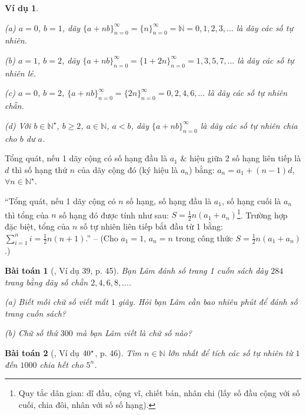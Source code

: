\documentclass{article}
\numberwithin{equation}{section}
\newtheorem{vidu}{Ví dụ}[section]
\newtheorem{baitoan}{Bài toán}[section]
\begin{document}
\begin{vidu}
	\begin{enumerate*}
		\item[(a)] $a = 0$, $b = 1$, dãy $\{a + n b\}_{n=0}^\infty = \{n\}_{n=0}^\infty = \mathbb{N} = 0,1,2,3,\ldots$ là dãy các số tự nhiên.
		\item[(b)] $a = 1$, $b = 2$, dãy $\{a + n b\}_{n=0}^\infty = \{1 + 2n\}_{n=0}^\infty = 1,3,5,7,\ldots$ là dãy các số tự nhiên lẻ.
		\item[(c)] $a = 0$, $b = 2$, $\{a + n b\}_{n=0}^\infty = \{2n\}_{n=0}^\infty = 0,2,4,6,\ldots$ là dãy các số tự nhiên chẵn.
		\item[(d)] Với $b\in\mathbb{N}^\star$, $b\ge 2$, $a\in\mathbb{N}$, $a < b$, dãy $\{a + n b\}_{n=0}^\infty$ là dãy các số tự nhiên chia cho $b$ dư $a$.
	\end{enumerate*}
\end{vidu}
Tổng quát, nếu 1 dãy cộng có số hạng đầu là $a_1$ \& hiệu giữa 2 số hạng liên tiếp là $d$ thì số hạng thứ $n$ của dãy cộng đó (ký hiệu là $a_n$) bằng: $a_n = a_1 + (n - 1)d$, $\forall n\in\mathbb{N}^\star$.

``Tổng quát, nếu 1 dãy cộng có $n$ số hạng, số hạng đầu là $a_1$, số hạng cuối là $a_n$ thì tổng của $n$ số hạng đó được tính như sau: $S = \frac{1}{2}n(a_1 + a_n)$\footnote{Quy tắc dân gian: dĩ đầu, cộng vĩ, chiết bán, nhân chi (lấy số đầu cộng với số cuối, chia đôi, nhân với số số hạng).}. Trường hợp đặc biệt, tổng của $n$ số tự nhiên liên tiếp bắt đầu từ 1 bằng: $\sum_{i=1}^n i = \frac{1}{2}n(n + 1)$.'' -- \cite[p. 45]{Binh_Toan_6_tap_1} (Cho $a_1 = 1$, $a_n = n$ trong công thức $S = \frac{1}{2}n(a_1 + a_n)$.)

\begin{baitoan}[\cite{Binh_Toan_6_tap_1}, Ví dụ 39, p. 45]
	Bạn Lâm đánh số trang 1 cuốn sách dày $284$ trang bằng dãy số chẵn $2,4,6,8,\ldots$.
	\begin{enumerate*}
		\item[(a)] Biết mỗi chữ số viết mất $1$ giây. Hỏi bạn Lâm cần bao nhiêu phút để đánh số trang cuốn sách?
		\item[(b)] Chữ số thứ $300$ mà bạn Lâm viết là chữ số nào?
	\end{enumerate*}
\end{baitoan}

\begin{baitoan}[\cite{Binh_Toan_6_tap_1}, Ví dụ $\rm 40^\star$, p. 46]
	Tìm $n\in\mathbb{N}$ lớn nhất để tích các số tự nhiên từ $1$ đến $1000$ chia hết cho $5^n$.
\end{baitoan}
\end{document}
